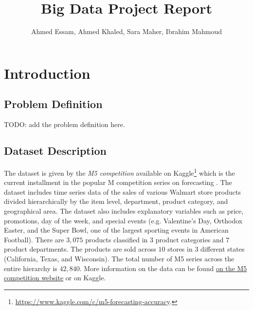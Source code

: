 \documentclass[11pt]{article}
\begin{document}
\title{Big Data Project Report}
\author{Ahmed Essam, Ahmed Khaled, Sara Maher, Ibrahim Mahmoud}

\maketitle


\tableofcontents
\clearpage

\section{Introduction}
\subsection{Problem Definition}
TODO: add the problem definition here.

\subsection{Dataset Description}
The dataset is given by the \emph{M5 competition} available on Kaggle\footnote{\url{https://www.kaggle.com/c/m5-forecasting-accuracy}.} which is the current installment in the popular M competition series on forecasting \citep{Makridakis2020}. The dataset includes time series data of the sales of various Walmart store products divided hierarchically by the item level, department, product category, and geographical area. The dataset also includes explanatory variables such as price, promotions, day of the week, and special events (e.g. Valentine's Day, Orthodox Easter, and the Super Bowl, one of the largest sporting events in American Football). There are $3,075$ products classified in $3$ product categories and $7$ product departments. The products are sold across $10$ stores in $3$ different states (California, Texas, and Wisconsin). The total number of M5 series across the entire hierarchy is $42,840$.  More information on the data can be found \href{https://mk0mcompetitiont8ake.kinstacdn.com/wp-content/uploads/2020/02/M5-Competitors-Guide_Final-1.pdf}{on the M5 competition website} or on Kaggle.
\end{document}
